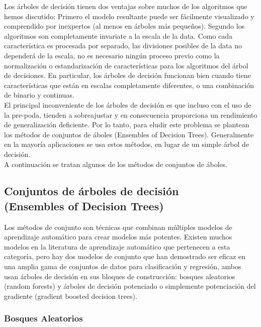 {Los árboles de decisión tienen dos ventajas sobre muchos de los algoritmos que hemos discutido:
Primero el modelo resultante puede ser fácilmente visualizado y comprendido por inexpertos (al menos en árboles más pequeños).  Segundo los algoritmos son completamente invariate  a la escala de la data.  Como cada característica es procesada por separado,  las  divisiones posibles de la data no dependerá de la escala, no es necesario ningún proceso previo como la normalización o estandarización de características para los algoritmos del árbol de decisiones.   En particular, los árboles de decisión funcionan bien cuando
tiene características que están en escalas completamente diferentes, o una combinación de binario y continuas.\\


El principal inconveniente de los árboles de decisión es que incluso con el uso de la pre-poda,
tienden a sobreajustar y en consecuencia proporciona un rendimiento de generalización deficiente.  Por lo tanto, para eludir este problema se plantean los  métodos de conjuntos de áboles (Ensembles of Decision Trees). Generalmente en la mayoría aplicaciones  se usa estos  métodos,  en lugar de un simple  árbol de decisión. \\

A continuación se tratan algunos de los métodos de conjuntos de áboles. 


\subsection{Conjuntos de árboles de decisión \\
	(Ensembles of Decision Trees)}


Los métodos de conjunto  son técnicas  que combinan múltiples modelos de aprendizaje automático para crear modelos más potentes. Existen muchos modelos en la literatura de aprendizaje automático que pertenecen a esta categoría, pero hay dos modelos de conjunto que han demostrado ser eficaz en una amplia gama de conjuntos de datos para clasificación y regresión,  ambos usan árboles de decisión en sus bloques de construcción: bosques aleatorios (random forests) y  árboles de decisión potenciado  
o simplemente potenciación del gradiente (gradient boosted decision trees).  

\subsubsection{Bosques Aleatorios}


}
